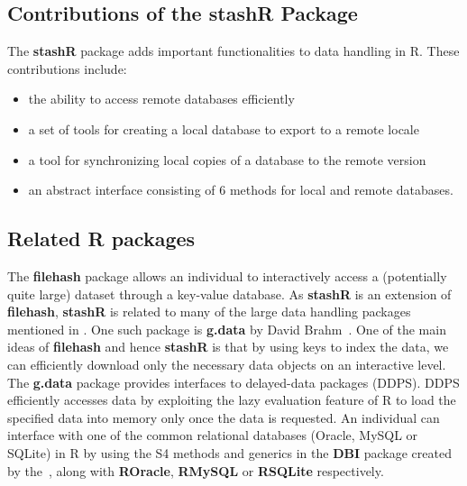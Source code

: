 \documentclass{article}
\newcommand{\pkg}{\textbf}
\begin{document}
\subsection{Contributions of the \pkg{stashR} Package}
The \pkg{stashR} package adds important functionalities to data handling in R.
These contributions include:
\begin{itemize}
    \item the ability to access remote databases efficiently
    \item a set of tools for creating a local database to export to a remote
        locale
    \item a tool for synchronizing local copies of a database to the remote 
        version
    \item an abstract interface consisting of 6 methods for local and remote 
        databases.
\end{itemize}  

\subsection{Related R packages}  

The \pkg{filehash} package allows an individual to interactively access a
(potentially quite large) dataset through a key-value database. As
\pkg{stashR} is an extension of \pkg{filehash}, \pkg{stashR} is
related to many of the large data handling packages mentioned in
\cite{filehash}. One such package is \pkg{g.data} by David
Brahm~\citep{g.data}. One of the main ideas of \pkg{filehash} and 
hence \pkg{stashR} is that by using keys to index the data, we 
can efficiently download only the necessary data objects on 
an interactive level. The \pkg{g.data} package provides interfaces
to delayed-data packages (DDPS). DDPS efficiently accesses data by 
exploiting the lazy evaluation feature of R to load the specified data into 
memory only once the data is requested. An individual can interface 
with one of the common relational databases (Oracle, MySQL or SQLite) in R by using 
the S4 methods and generics in the \pkg{DBI} package created by the~\cite{DBI},
along with \pkg{ROracle}, \pkg{RMySQL} or \pkg{RSQLite} respectively. 
\end{document}
